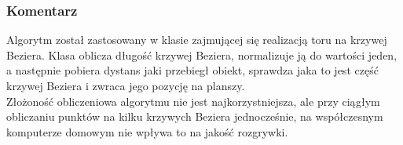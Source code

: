 		\subsubsection{{\large Komentarz}}
			\indent \indent Algorytm został zastosowany w klasie zajmującej się realizacją toru na krzywej Beziera. Klasa oblicza długość krzywej Beziera, normalizuje ją do wartości jeden, a następnie pobiera dystans jaki przebiegł obiekt, sprawdza jaka to jest część krzywej Beziera i zwraca jego pozycję na planszy.\\
			\indent Złożoność obliczeniowa algorytmu nie jest najkorzystniejsza, ale przy ciągłym obliczaniu punktów na kilku krzywych Beziera jednocześnie, na współczesnym komputerze domowym nie wpływa to na jakość rozgrywki.
			